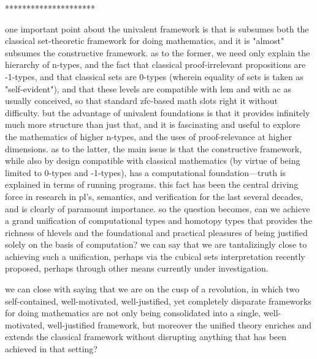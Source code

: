 \documentclass[11pt]{article}
\theoremstyle{remark}
\theoremstyle{definition}
\begin{document}
*********************

one important point about the univalent framework is that is subsumes both the classical set-theoretic framework for doing mathematics, and it is "almost" subsumes the constructive framework.  as to the former, we need only explain the hierarchy of n-types, and the fact that classical proof-irrelevant propositions are -1-types, and that classical sets are 0-types (wherein equality of sets is taken as "self-evident"), and that these levels are compatible with lem and with ac as usually conceived, so that standard zfc-based math slots right it without difficulty.  but the advantage of univalent foundations is that it provides infinitely much more structure than just that, and it is fascinating and useful to explore the mathematics of higher n-types, and the uses of proof-relevance at higher dimensions.  as to the latter, the main issue is that the constructive framework, while also by design compatible with classical mathematics (by virtue of being limited to 0-types and -1-types), has a computational foundation---truth is explained in terms of running programs.  this fact has been the central driving force in research in pl's, semantics, and verification for the last several decades, and is clearly of paramount importance.  so the question becomes, can we achieve a grand unification of computational types and homotopy types that provides the richness of hlevels and the foundational and practical pleasures of being justified solely on the basis of computation?  we can say that we are tantalizingly close to achieving such a unification, perhaps via the cubical sets interpretation recently proposed, perhaps through other means currently under investigation.

we can close with saying that we are on the cusp of a revolution, in which two self-contained, well-motivated, well-justified, yet completely disparate frameworks for doing mathematics are not only being consolidated into a single, well-motivated, well-justified framework, but moreover the unified theory enriches and extends the classical framework without disrupting anything that has been achieved in that setting?
\end{document}
